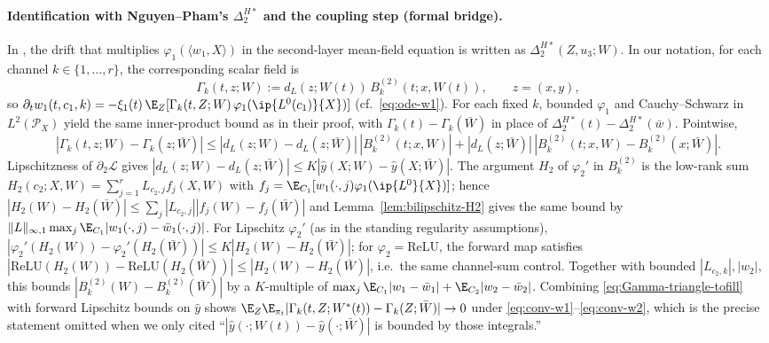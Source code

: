 \documentclass[nohyperref]{article}
\theoremstyle{plain}
\theoremstyle{definition}
\theoremstyle{remark}
\begin{document}
\paragraph{Identification with Nguyen--Pham's $\Delta_2^{H*}$ and the coupling step (formal bridge).}
In \cite{nguyen2023rigorousframeworkmeanfield}, the drift that multiplies $\varphi_1(\langle w_1,X\rangle)$ in the second-layer mean-field equation is written as $\Delta_2^{H*}(Z,u_3;W)$. In our notation, for each channel $k\in\{1,\ldots,r\}$, the corresponding scalar field is
\begin{equation}
\label{eq:Gamma-k-bridge}
\Gamma_k(t,z;W):=d_L(z;W(t))\,B_k^{(2)}(t;x,W(t)),\qquad z=(x,y),
\end{equation}
so $\partial_t w_1(t,c_1,k)=-\xi_1(t)\,\E_Z[\Gamma_k(t,Z;W)\,\varphi_1(\ip{L^0(c_1)}{X})]$ (cf.\ \eqref{eq:ode-w1}). For each fixed $k$, bounded $\varphi_1$ and Cauchy--Schwarz in $L^2(\mathcal{P}_X)$ yield the same inner-product bound as in their proof, with $\Gamma_k(t)-\Gamma_k(\bar W)$ in place of $\Delta_2^{H*}(t)-\Delta_2^{H*}(\bar w)$. Pointwise,
\begin{equation}
\label{eq:Gamma-triangle-tofill}
|\Gamma_k(t,z;W)-\Gamma_k(z;\bar W)|
\le |d_L(z;W)-d_L(z;\bar W)|\,|B_k^{(2)}(t;x,W)|
+|d_L(z;\bar W)|\,|B_k^{(2)}(t;x,W)-B_k^{(2)}(x;\bar W)|.
\end{equation}
Lipschitzness of $\partial_2\mathcal{L}$ gives $|d_L(z;W)-d_L(z;\bar W)|\le K|\hat y(X;W)-\hat y(X;\bar W)|$. The argument $H_2$ of $\varphi_2'$ in $B_k^{(2)}$ is the low-rank sum $H_2(c_2;X,W)=\sum_{j=1}^r L_{c_2,j}f_j(X,W)$ with $f_j=\E_{C_1}[w_1(\cdot,j)\varphi_1(\ip{L^0}{X})]$; hence $|H_2(W)-H_2(\bar W)|\le \sum_j|L_{c_2,j}||f_j(W)-f_j(\bar W)|$ and Lemma~\ref{lem:bilipschitz-H2} gives the same bound by $\|L\|_{\infty,1}\max_j\E_{C_1}|w_1(\cdot,j)-\bar w_1(\cdot,j)|$. For Lipschitz $\varphi_2'$ (as in the standing regularity assumptions), $|\varphi_2'(H_2(W))-\varphi_2'(H_2(\bar W))|\le K|H_2(W)-H_2(\bar W)|$; for $\varphi_2=\mathrm{ReLU}$, the forward map satisfies $|\mathrm{ReLU}(H_2(W))-\mathrm{ReLU}(H_2(\bar W))|\le |H_2(W)-H_2(\bar W)|$, i.e.\ the same channel-sum control. Together with bounded $|L_{c_2,k}|,|w_2|$, this bounds $|B_k^{(2)}(W)-B_k^{(2)}(\bar W)|$ by a $K$-multiple of $\max_j\E_{C_1}|w_1-\bar w_1|+\E_{C_2}|w_2-\bar w_2|$. Combining \eqref{eq:Gamma-triangle-tofill} with forward Lipschitz bounds on $\hat y$ shows $\E_Z\E_{\pi_t}|\Gamma_k(t,Z;W^*(t))-\Gamma_k(Z;\bar W)|\to 0$ under \eqref{eq:conv-w1}--\eqref{eq:conv-w2}, which is the precise statement omitted when we only cited ``$|\hat y(\cdot;W(t))-\hat y(\cdot;\bar W)|$ is bounded by those integrals.''
\end{document}
